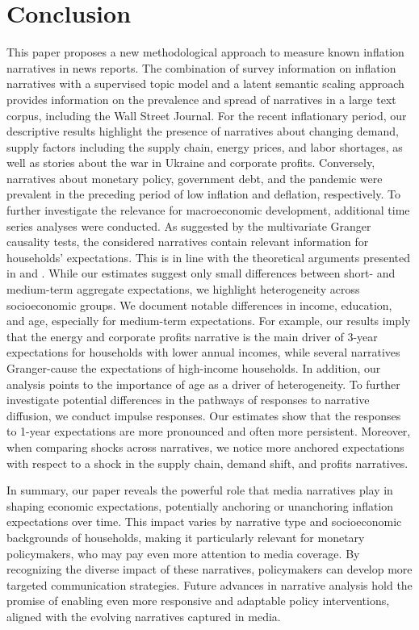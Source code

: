 \section{Conclusion}\label{sec:Conclusion}


This paper proposes a new methodological approach to measure known inflation narratives in news reports. The combination of survey information on inflation narratives with a supervised topic model and a latent semantic scaling approach provides information on the prevalence and spread of narratives in a large text corpus, including the Wall Street Journal. For the recent inflationary period, our descriptive results highlight the presence of narratives about changing demand, supply factors including the supply chain, energy prices, and labor shortages, as well as stories about the war in Ukraine and corporate profits. Conversely, narratives about monetary policy, government debt, and the pandemic were prevalent in the preceding period of low inflation and deflation, respectively. To further investigate the relevance for macroeconomic development, additional time series analyses were conducted. As suggested by the multivariate Granger causality tests, the considered narratives contain relevant information for households' expectations. This is in line with the theoretical arguments presented in \cite{Shiller.2017, Tuckett.2020} and \cite{Beckert.2016}. While our estimates suggest only small differences between short- and medium-term aggregate expectations, we highlight heterogeneity across socioeconomic groups. We document notable differences in income, education, and age, especially for medium-term expectations. For example, our results imply that the energy and corporate profits narrative is the main driver of 3-year expectations for households with lower annual incomes, while several narratives Granger-cause the expectations of high-income households. In addition, our analysis points to the importance of age as a driver of heterogeneity. To further investigate potential differences in the pathways of responses to narrative diffusion, we conduct impulse responses. Our estimates show that the responses to 1-year expectations are more pronounced and often more persistent. Moreover, when comparing shocks across narratives, we notice more anchored expectations with respect to a shock in the supply chain, demand shift, and profits narratives.

In summary, our paper reveals the powerful role  that media narratives play in shaping economic expectations, potentially anchoring or unanchoring inflation expectations over time. This impact varies by narrative type and socioeconomic backgrounds of households, making it  particularly relevant for monetary policymakers, who may pay even more attention to media coverage. By recognizing the diverse impact of these narratives, policymakers can develop more targeted communication strategies. Future advances in narrative analysis hold the promise of enabling even more responsive and adaptable policy interventions, aligned with the evolving narratives captured in media.